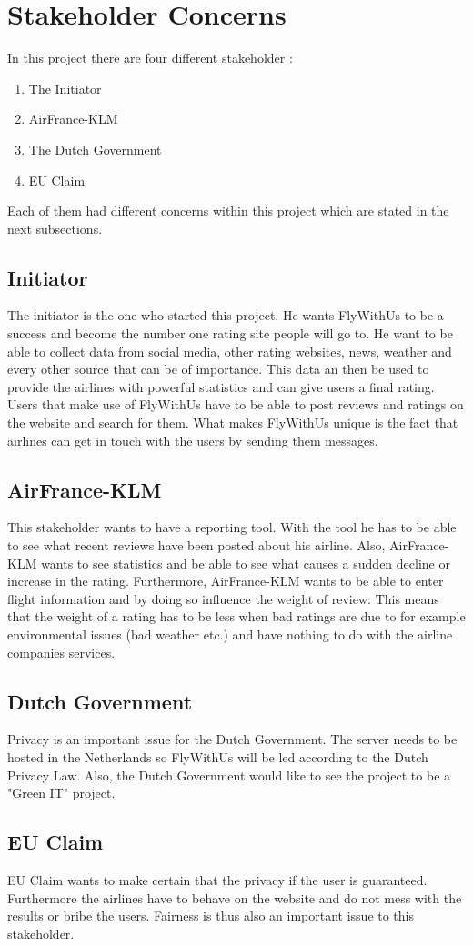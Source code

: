 \section{Stakeholder Concerns}

In this project there are four different stakeholder :
\begin{enumerate}
\item The Initiator
\item AirFrance-KLM
\item The Dutch Government
\item EU Claim
\end{enumerate}

Each of them had different concerns within this project which are stated in the next subsections.

\subsection{Initiator}
The initiator is the one who started this project. He wants FlyWithUs to be a success and become the number one rating site people will go to. He want to be able to collect data from social media, other rating websites, news, weather and every other source that can be of importance. This data an then be used to provide the airlines with powerful statistics and can give users a final rating. Users that make use of FlyWithUs have to be able to post reviews and ratings on the website and search for them. What makes FlyWithUs unique is the fact that airlines can get in touch with the users by sending them messages.

\subsection{AirFrance-KLM}
This stakeholder wants to have a reporting tool. With the tool he has to be able to see what recent reviews have been posted about his airline. Also, AirFrance-KLM wants to see statistics and be able to see what causes a sudden decline or increase in the rating. Furthermore, AirFrance-KLM wants to be able to enter flight information and by doing so influence the weight of review. This means that the weight of a rating has to be less when bad ratings are due to for example environmental issues (bad weather etc.) and have nothing to do with the airline companies services.

\subsection{Dutch Government}
Privacy is an important issue for the Dutch Government. The server needs to be hosted in the Netherlands so FlyWithUs will be led according to the Dutch Privacy Law. Also, the Dutch Government would like to see the project to be a "Green IT" project. 

\subsection{EU Claim}
EU Claim wants to make certain that the privacy if the user is guaranteed. Furthermore the airlines have to behave on the website and do not mess with the results or bribe the users. Fairness is thus also an important issue to this stakeholder.

